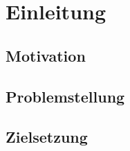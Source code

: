 \clearpage

\section{Einleitung}

\subsection{Motivation}

\subsection{Problemstellung}


\subsection{Zielsetzung}


